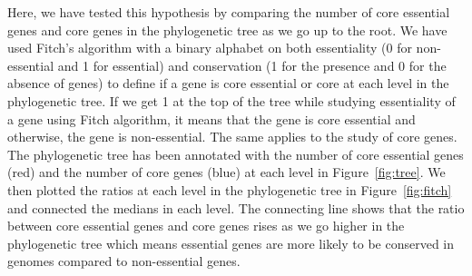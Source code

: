 \documentclass[12pt,letterpaper]{article}
\begin{document}
Here, we have tested this hypothesis by comparing the number of core essential genes and core genes in the phylogenetic tree as we go up to the root. We have used Fitch's algorithm \cite{fitch_toward_1971} with a binary alphabet on both essentiality (0 for non-essential and 1 for essential) and conservation (1 for the presence and 0 for the absence of genes) to define if a gene is core essential or core at each level in the phylogenetic tree. If we get 1 at the top of the tree while studying essentiality of a gene using Fitch algorithm, it means that the gene is core essential and otherwise, the gene is non-essential. The same applies to the study of core genes. The phylogenetic tree has been annotated with the number of core essential genes (red) and the number of core genes (blue) at each level in Figure~\ref{fig:tree}. We then plotted the ratios at each level in the phylogenetic tree in Figure~\ref{fig:fitch} and connected the medians in each level. The connecting line shows that the ratio between core essential genes and core genes rises as we go higher in the phylogenetic tree which means essential genes are more likely to be conserved in genomes compared to non-essential genes.
\end{document}
